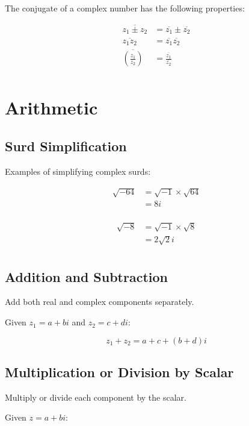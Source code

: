 \documentclass[a4paper,11pt]{article}
\begin{document}
The conjugate of a complex number has the following properties:

$$
\begin{aligned}
\overline{z_1 \pm z_2} & = \overline{z_1} \pm \overline{z_2} \\
\overline{z_1 z_2} & = \overline{z_1} \overline{z_2} \\
\overline{(\frac{z_1}{z_2})} & = \frac{\overline{z_1}}{\overline{z_2}} \\
\end{aligned}
$$




\section{Arithmetic}

\subsection{Surd Simplification}

Examples of simplifying complex surds:

$$
\begin{aligned}
\sqrt{-64} & = \sqrt{-1} \times \sqrt{64} \\
& = 8i \\
\end{aligned}
$$

$$
\begin{aligned}
\sqrt{-8} & = \sqrt{-1} \times \sqrt{8} \\
& = 2 \sqrt{2} i \\
\end{aligned}
$$


\subsection{Addition and Subtraction}

Add both real and complex components separately.

Given $z_1 = a + bi$ and $z_2 = c + di$:

$$
z_1 + z_2 = a + c + (b + d)i
$$


\subsection{Multiplication or Division by Scalar}

Multiply or divide each component by the scalar.

Given $z = a + bi$:
\end{document}
